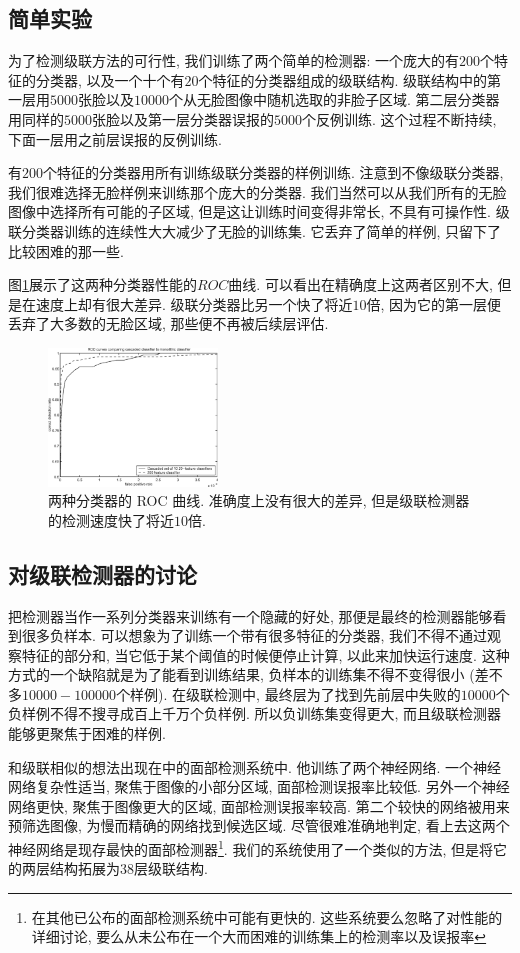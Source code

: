 \documentclass[a4paper,utf8,11pt]{ctexart}
\begin{document}
\subsection{简单实验}
为了检测级联方法的可行性, 我们训练了两个简单的检测器: 一个庞大的有$200$个特征的分类器, 以及一个十个有$20$个特征的分类器组成的级联结构. 级联结构中的第一层用$5000$张脸以及$10000$个从无脸图像中随机选取的非脸子区域.
第二层分类器用同样的$5000$张脸以及第一层分类器误报的$5000$个反例训练. 这个过程不断持续, 下面一层用之前层误报的反例训练.

有$200$个特征的分类器用所有训练级联分类器的样例训练. 注意到不像级联分类器, 我们很难选择无脸样例来训练那个庞大的分类器. 我们当然可以从我们所有的无脸图像中选择所有可能的子区域, 但是这让训练时间变得非常长, 不具有可操作性. 级联分类器训练的连续性大大减少了无脸的训练集. 它丢弃了简单的样例, 只留下了比较困难的那一些.

图\ref{fig:comp}展示了这两种分类器性能的$ROC$曲线. 可以看出在精确度上这两者区别不大, 但是在速度上却有很大差异. 级联分类器比另一个快了将近$10$倍, 因为它的第一层便丢弃了大多数的无脸区域, 那些便不再被后续层评估.
\begin{figure}
\centering
\includegraphics[width=0.4\textwidth]{ROC.png}
\caption{两种分类器的 ROC 曲线. 准确度上没有很大的差异, 但是级联检测器的检测速度快了将近$10$倍.}
\label{fig:comp}
\end{figure}
\subsection{对级联检测器的讨论}
把检测器当作一系列分类器来训练有一个隐藏的好处, 那便是最终的检测器能够看到很多负样本. 可以想象为了训练一个带有很多特征的分类器, 我们不得不通过观察特征的部分和, 当它低于某个阈值的时候便停止计算, 以此来加快运行速度. 这种方式的一个缺陷就是为了能看到训练结果, 负样本的训练集不得不变得很小 (差不多$10000-100000$个样例).
在级联检测中, 最终层为了找到先前层中失败的$10000$个负样例不得不搜寻成百上千万个负样例. 所以负训练集变得更大, 而且级联检测器能够更聚焦于困难的样例.

和级联相似的想法出现在\citet{rowley1998neural}中的面部检测系统中. 他训练了两个神经网络. 一个神经网络复杂性适当, 聚焦于图像的小部分区域, 面部检测误报率比较低. 另外一个神经网络更快, 聚焦于图像更大的区域, 面部检测误报率较高. 第二个较快的网络被用来预筛选图像, 为慢而精确的网络找到候选区域.
尽管很难准确地判定, 看上去这两个神经网络是现存最快的面部检测器\footnote{在其他已公布的面部检测系统中可能有更快的. 这些系统要么忽略了对性能的详细讨论, 要么从未公布在一个大而困难的训练集上的检测率以及误报率}. 我们的系统使用了一个类似的方法, 但是将它的两层结构拓展为$38$层级联结构.
\end{document}

